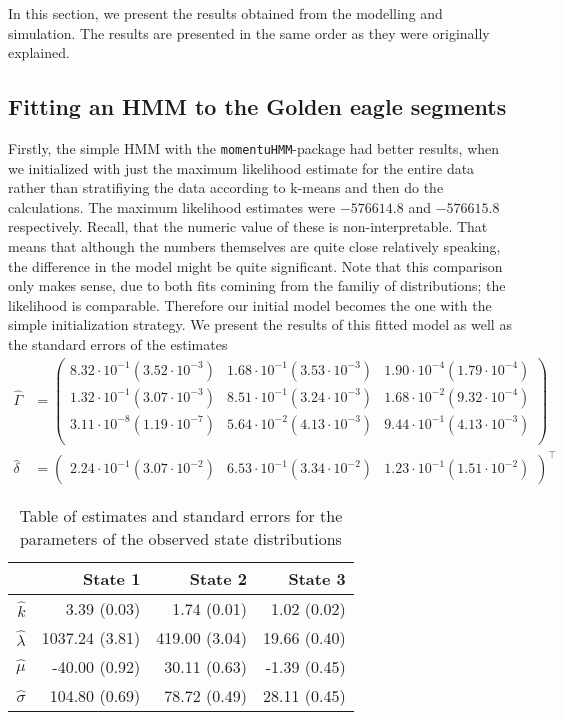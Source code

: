 In this section, we present the results obtained from the modelling and simulation. The results are presented in the same order as they were originally explained.
\subsection{Fitting an HMM to the Golden eagle segments}
Firstly, the simple HMM with the \texttt{momentuHMM}-package had better results, when we initialized with just the maximum likelihood estimate for the entire data rather than stratifiying the data according to k-means and then do the calculations. The maximum likelihood estimates were $-576614.8$ and $-576615.8$ respectively. Recall, that the numeric value of these is non-interpretable. That means that although the numbers themselves are quite close relatively speaking, the difference in the model might be quite significant. Note that this comparison only makes sense, due to both fits comining from the familiy of distributions; the likelihood is comparable. Therefore our initial model becomes the one with the simple initialization strategy. We present the results of this fitted model as well as the standard errors of the estimates
\begin{align}
    \hat{\Gamma} &= \begin{pmatrix}
    8.32 \cdot 10^{-1} (3.52 \cdot 10^{-3}) & 1.68 \cdot 10^{-1} (3.53 \cdot 10^{-3}) & 1.90 \cdot 10^{-4} (1.79 \cdot 10^{-4})\\
    1.32 \cdot 10^{-1} (3.07 \cdot 10^{-3}) & 8.51 \cdot 10^{-1} (3.24 \cdot 10^{-3}) & 1.68 \cdot 10^{-2} (9.32 \cdot 10^{-4})\\
    3.11 \cdot 10^{-8} (1.19 \cdot 10^{-7}) & 5.64 \cdot 10^{-2} (4.13 \cdot 10^{-3}) & 9.44 \cdot 10^{-1} (4.13 \cdot 10^{-3})\\
    \end{pmatrix}\\
    \hat{\delta} &= \begin{pmatrix}
        2.24 \cdot 10^{-1} (3.07 \cdot 10^{-2}) &
        6.53 \cdot 10^{-1} (3.34 \cdot 10^{-2}) &
        1.23 \cdot 10^{-1} (1.51 \cdot 10^{-2})
    \end{pmatrix}^\top
    \end{align}
\begin{table}[h]
    \centering
    \begin{tabular}{rrrr}
        \hline
        & \textbf{State 1} & \textbf{State 2} & \textbf{State 3} \\
        \hline
        $\hat{k}$ & 3.39 (0.03) & 1.74 (0.01) & 1.02 (0.02) \\
        $\hat{\lambda}$ & 1037.24 (3.81) & 419.00 (3.04) & 19.66 (0.40) \\
        $\hat{\mu}$ & -40.00 (0.92) & 30.11 (0.63) & -1.39 (0.45) \\ 
        $\hat{\sigma}$ & 104.80 (0.69) & 78.72 (0.49) & 28.11 (0.45) \\ 
        \hline
    \end{tabular}
    \caption{Table of estimates and standard errors for the parameters of the observed state distributions}
    \label{estimParam1}
\end{table}\\

